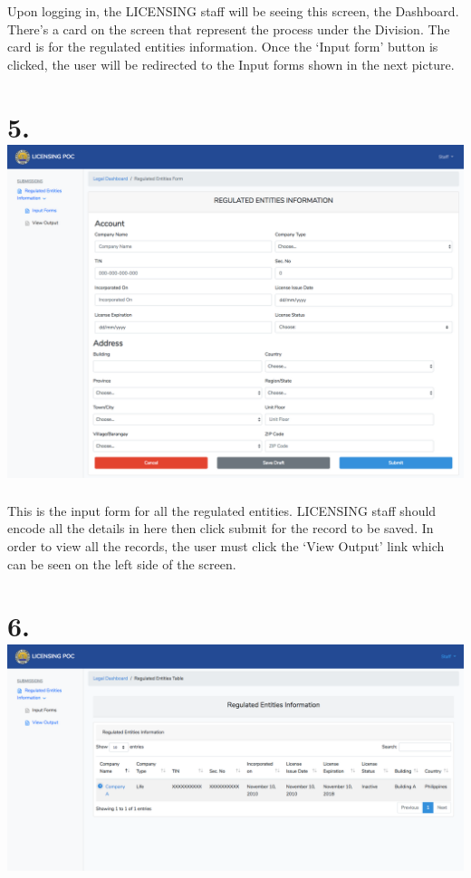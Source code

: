\documentclass{article}
\begin{document}
Upon logging in, the LICENSING staff will be seeing
this screen, the Dashboard. There’s a card on the screen that represent
the process under the Division. The card is for the regulated entities information.
Once the ‘Input form’ button is clicked, the user will be redirected to
the Input forms shown in the next picture.%

\section{5.\hspace*{0.5em}\includegraphics[keepaspectratio=true]{up-ic-screens/image27}{}}\label{sec-up-ic-screensimage27png}%

\noindent{}This is the input form for all the regulated entities.
LICENSING staff should encode all the details in here then click submit
for the record to be saved. In order to view all the records, the user
must click the ‘View Output’ link which can be seen on the left side of
the screen.%

\section{6.\hspace*{0.5em}\includegraphics[keepaspectratio=true]{up-ic-screens/image184}{}}\label{sec-up-ic-screensimage184png}%
\end{document}
